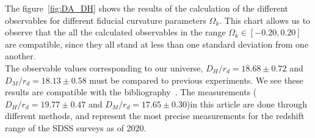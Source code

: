 The figure~\ref{fig:DA_DH} shows the results of the calculation of the different observables for different fiducial curvature parameters $\Omega_k$. This chart allows us to observe that the all the calculated observables in the range $\Omega_k  \in \left[ -0.20, 0.20   \right] $ are compatible, since they all stand at less than one standard deviation from one another. \\

The observable values corresponding to our universe, $D_H/r_d = 18.68 \pm 0.72$ and $D_M/r_d = 18.13 \pm 0.58$ must be compared to previous experiments. We see these results are compatible with the bibliography~\cite{hector}. The measurements ($D_H/r_d = 19.77\pm0.47$ and $D_M/ r_d=17.65\pm 0.30$)in this article are done through different methods, and represent the most precise measurements for the redshift range of the SDSS surveys as of 2020.

